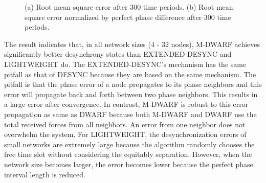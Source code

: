 \begin{figure}[!t]
\centerline {
	\hfil
}
\caption{(a) Root mean square error after 300 time periods. (b) Root mean square error normalized by perfect phase difference after 300 time periods.}
\lofcont
\end{figure}

The result indicates that, in all network sizes (4 - 32 nodes), M-DWARF achieves significantly better desynchrony states than EXTENDED-DESYNC and LIGHTWEIGHT do. 
The EXTENDED-DESYNC's mechanism has the same pitfall as that of DESYNC because they are based on the same mechanism. The pitfall is that the phase error of a node propagates to its phase neighbors and this error will propagate back and forth between two phase neighbors. This results in a large error after convergence.
In contrast, M-DWARF is robust to this error propagation as same as DWARF because both M-DWARF and DWARF use the total received forces from all neighbors. An error from one neighbor does not overwhelm the system.
For LIGHTWEIGHT, the desynchronization errors of small networks are extremely large because the algorithm randomly chooses the free time slot without considering the equitably separation. However, when the network size becomes larger, the error becomes lower because the perfect phase interval length is reduced.

